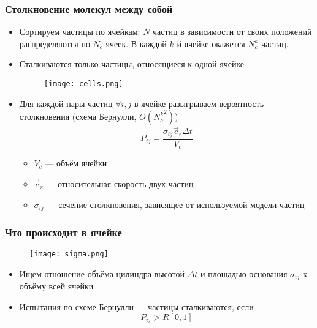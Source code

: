 \documentclass[onlymath]{beamer}
\begin{document}
\begin{frame}
  \frametitle{Столкновение молекул между собой}
  \begin{itemize}
  \item Сортируем частицы по ячейкам: $N$ частиц в зависимости от
    своих положений распределяются по $N_c$ ячеек. В каждой $k$-й
    ячейке окажется $N_c^k$ частиц.
  \item Сталкиваются только частицы, относящиеся к одной ячейке
    \begin{figure}
      \centering
      \texttt{[image: cells.png]}
    \end{figure}
  \item Для каждой пары частиц $\forall i, j$ в ячейке разыгрываем вероятность
    столкновения (схема Бернулли, $O({N_c^k}^2)$)
    \begin{equation*}
      P_{ij} = \frac{\sigma_{ij}\vec{c}_r\Delta t}{V_c}
    \end{equation*}
    \begin{itemize}
    \item $V_c$ — объём ячейки
    \item $\vec{c}_r$ — относительная скорость двух частиц
    \item $\sigma_{ij}$ — сечение столкновения, зависящее от
      используемой модели частиц
    \end{itemize}
  \end{itemize}
\end{frame}

\begin{frame}
  \frametitle{Что происходит в ячейке}
  \begin{figure}
    \centering
    \texttt{[image: sigma.png]}
  \end{figure}
  \begin{itemize}
  \item Ищем отношение объёма цилиндра высотой $\Delta t$ и площадью
    основания $\sigma_{ij}$ к объёму всей ячейки
  \item Испытания по схеме Бернулли — частицы сталкиваются, если
    \begin{equation*}
      P_{ij} > R[0,1]
    \end{equation*}
  \end{itemize}
\end{frame}
\end{document}

